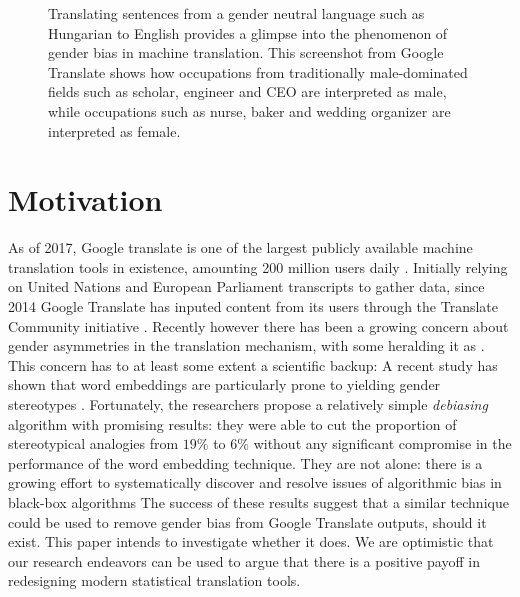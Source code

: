 \documentclass[fleqn,10pt]{article}
\begin{document}
\begin{figure}[h]
	\centering
	\caption{Translating sentences from a gender neutral language such as Hungarian to English provides a glimpse into the phenomenon of gender bias in machine translation. This screenshot from Google Translate shows how occupations from traditionally male-dominated fields such as scholar, engineer and CEO are interpreted as male, while occupations such as nurse, baker and wedding organizer are interpreted as female.}
	\label{fig:screenshot-gtranslate-hungarian}
\end{figure}

\section{Motivation}

As of 2017, Google translate is one of the largest publicly available machine translation tools in existence, amounting 200 million users daily \cite{Gtranslate200daily2017}. Initially relying on United Nations and European Parliament transcripts to gather data, since 2014 Google Translate has inputed content from its users through the Translate Community initiative \cite{TranslateCommunity}. Recently however there has been a growing concern about gender asymmetries in the translation mechanism, with some heralding it as  \cite{AlgorithmGtranslateSexist2018}. This concern has to at least some extent a scientific backup: A recent study has shown that word embeddings are particularly prone to yielding gender stereotypes \cite{bolukbasi2016man}. Fortunately, the researchers propose a relatively simple \emph{debiasing} algorithm with promising results: they were able to cut the proportion of stereotypical analogies from $19\%$ to $6\%$ without any significant compromise in the performance of the word embedding technique. They are not alone: there is a growing effort to systematically discover and resolve issues of algorithmic bias in black-box algorithms \cite{hajian2016algorithmic} The success of these results suggest that a similar technique could be used to remove gender bias from Google Translate outputs, should it exist. This paper intends to investigate whether it does. We are optimistic that our research endeavors can be used to argue that there is a positive payoff in redesigning modern statistical translation tools.
\end{document}

